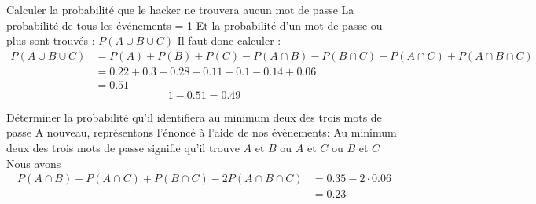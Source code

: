 \begin{exo}
\begin{subexo}{Calculer la probabilité que le hacker ne trouvera aucun mot de passe}
        La probabilité de tous les événements = 1\newline
        Et la probabilité d'un mot de passe ou plus sont trouvés : $P(A\cup B \cup C)$
        \newline Il faut donc calculer : 
        \begin{align*}
            P(A\cup B \cup C) &= P(A) + P(B) + P(C) - P(A\cap B) - P(B\cap C) - P(A\cap C) + P(A\cap B \cap C)\\
            &= 0.22 + 0.3 + 0.28 - 0.11 -0.1 - 0.14 + 0.06\\
            &= 0.51
        \end{align*}
        $$ 1- 0.51 = 0.49 $$
    \end{subexo}
    \begin{subexo}{Déterminer la probabilité qu'il identifiera au minimum deux des trois mots de passe}
        A nouveau, représentons l'énoncé à l'aide de nos évènements:
        Au minimum deux des trois mots de passe signifie qu'il trouve $A\text{ et } B $ ou $A$ et $C$ ou $B$ et $C$
        Nous avons \begin{align*}
            P(A\cap B) + P(A\cap C) + P(B \cap C) - 2P(A\cap B \cap C) &= 0.35-2\cdot 0.06\\
            &= 0.23
        \end{align*}
    \end{subexo}
\end{exo}